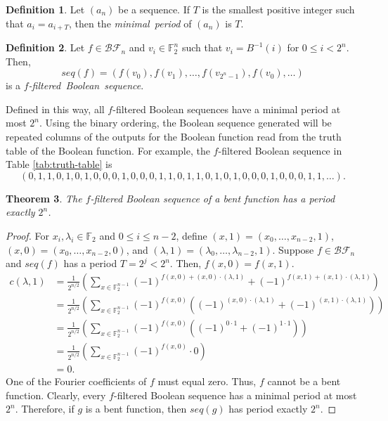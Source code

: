 \documentclass[english]{article}
\def\gftwo{\mathbb{F}_2}
\def\BF{\mathcal{BF}}
\theoremstyle{plain}
\newtheorem{theorem}{Theorem}[subsection]
\theoremstyle{definition}
\newtheorem{definition}[theorem]{Definition}%
\theoremstyle{remark}
\begin{document}
\begin{definition}
  Let $(a_n)$ be a sequence. If $T$ is the smallest positive integer such that
  $a_i=a_{i+T}$, then the {\em minimal\ period} of $(a_n)$ is $T$.
\end{definition}

\begin{definition}\label{def:lex-Bool-seq}
  Let $f\in\BF_n$ and $v_i\in\gftwo^n$ such that $v_i=B^{-1}(i)$ for
  $0\leq i<2^n$. Then,
  \begin{equation}
    seq(f)=(f(v_0),f(v_1),\dots,f(v_{2^n-1}),f(v_0),\dots)
  \end{equation}
  is a {\em $f$-filtered\ Boolean\ sequence}.
\end{definition}

\par Defined in this way, all $f$-filtered Boolean sequences have a
minimal period at most $2^n$. Using the binary ordering, the Boolean
sequence generated will be repeated columns of the outputs for the Boolean
function read from the truth table of the Boolean function. For example, the
$f$-filtered Boolean sequence in Table \ref{tab:truth-table} is
\[
(0,1,1,0,1,0,1,0,0,0,1,0,0,0,1,1,0,1,1,0,1,0,1,0,0,0,1,0,0,0,1,1,\dots).
\]

\begin{theorem}
  The $f$-filtered Boolean sequence of a bent function has a period
  exactly $2^n$.
\end{theorem}
\begin{proof}
  For $x_i,\lambda_i\in\gftwo$ and $0\leq i\leq n-2$, define
  $(x,1)=\allowbreak(x_0,\dots,\allowbreak x_{n-2},1)$,
  $(x,0)=\allowbreak(x_0,\dots,\allowbreak x_{n-2},0)$, and
  $(\lambda,1)=\allowbreak(\lambda_0,\dots,\allowbreak \lambda_{n-2},1)$.
  Suppose $f\in\BF_n$ and $seq(f)$ has a period $T=2^j<2^n$. Then,
  $f(x,0)=f(x,1)$.
  {\allowdisplaybreaks
  \begin{align*}
    c(\lambda,1)&=\frac{1}{2^{n/2}}
      \left(\sum_{x\in\gftwo^{n-1}}
        {(-1)^{f(x,0)+(x,0)\cdot(\lambda,1)}+
        (-1)^{f(x,1)+(x,1)\cdot(\lambda,1)}}
      \right)\\
    &=\frac{1}{2^{n/2}}
      \left(\sum_{x\in\gftwo^{n-1}}
        {(-1)^{f(x,0)}\left((-1)^{(x,0)\cdot(\lambda,1)}+
        (-1)^{(x,1)\cdot(\lambda,1)}\right)}
      \right)\\
    &=\frac{1}{2^{n/2}}
      \left(\sum_{x\in\gftwo^{n-1}}
      {(-1)^{f(x,0)}\left((-1)^{0\cdot1}+(-1)^{1\cdot1}\right)}
      \right)\\
    &=\frac{1}{2^{n/2}}
      \left(\sum_{x\in\gftwo^{n-1}}{(-1)^{f(x,0)}\cdot0}\right)\\
    &=0.
  \end{align*}
  }
  One of the Fourier coefficients of $f$ must equal zero. Thus, $f$ cannot
  be a bent function. Clearly, every $f$-filtered Boolean sequence has a
  minimal period at most $2^n$. Therefore, if $g$ is a bent function, then
  $seq(g)$ has period exactly $2^n$.
\end{proof}
\end{document}
